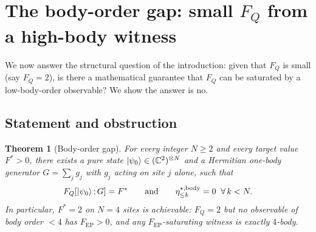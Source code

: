 \documentclass[11pt,a4paper]{article}
\newcommand{\FQ}{F_Q}
\newcommand{\FEP}{F_{\mathrm{EP}}}
\newcommand{\PsiZ}{\ket{\psi_0}}
\newcommand{\etabody}[1]{\eta^{\star,\mathrm{body}}_{\le #1}}
\newtheorem{theorem}{Theorem}
\begin{document}
\section{The body-order gap: small $\FQ$ from a high-body witness}
\label{sec:gap}

We now answer the structural question of the introduction: given
that $\FQ$ is small (say $\FQ=2$), is there a mathematical
guarantee that $\FQ$ can be saturated by a low-body-order
observable?  We show the answer is no.

\subsection{Statement and obstruction}

\begin{theorem}[Body-order gap]
\label{thm:gap}
For every integer $N\ge2$ and every target value $F^*>0$, there
exists a pure state $\PsiZ\in(\mathbb C^2)^{\otimes N}$ and a
Hermitian one-body generator $G=\sum_jg_j$ with $g_j$ acting on
site $j$ alone, such that
\begin{equation}
   \FQ[\PsiZ;G]=F^*\qquad\text{and}\qquad
   \etabody{k}=0\;\;\forall\,k<N.
\end{equation}
In particular, $F^*=2$ on $N=4$ sites is achievable: $\FQ=2$ but
no observable of body order $<4$ has $\FEP>0$, and any
$\FEP$-saturating witness is exactly $4$-body.
\end{theorem}
\end{document}
